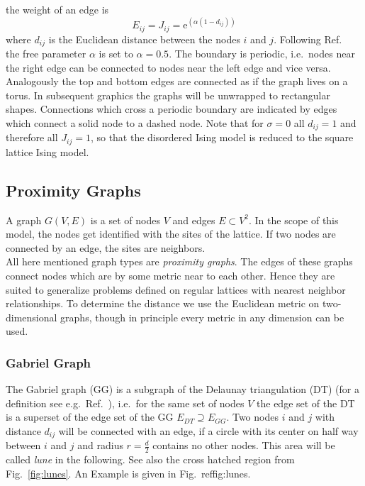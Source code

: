 the weight of an edge is
\begin{equation}
    E_{ij} = J_{ij} = \mathrm{e}^{(\alpha (1-d_{ij}))}
    \label{eq:coupling}
\end{equation}
where \(d_{ij}\) is the Euclidean
distance between the nodes \(i\) and \(j\). Following Ref.\ \cite{Lima2000}
the free parameter \(\alpha\) is set to \(\alpha = 0.5\).
The boundary is periodic, i.e.\ nodes near the right edge can be
connected to nodes near the left edge and vice versa. Analogously the
top and bottom edges are connected as if the graph lives on a torus.
In subsequent graphics the graphs will be unwrapped to rectangular
shapes. Connections which cross a periodic boundary are indicated
by edges which connect a solid node to a dashed node.
Note that for \(\sigma = 0\) all \(d_{ij} = 1\) and therefore all
\(J_{ij} = 1\), so that the disordered Ising model is reduced to the
square lattice Ising model.

\subsection{Proximity Graphs}
\label{ssec:graphtypes}
    A graph \(G(V,E)\) is a set of nodes \(V\) and edges \(E \subset V^{2}\).
    In the scope of this model, the nodes get identified with the sites of the
    lattice. If two nodes are connected by an edge, the sites are neighbors.\\
    All here mentioned graph types are \emph{proximity graphs}.
    The edges of these graphs connect nodes which are by some metric near
    to each other.
    Hence they are suited to generalize problems defined on regular
    lattices with nearest neighbor relationships.
    To determine the distance we use the Euclidean
    metric on two-dimensional graphs, though in principle every metric in any
    dimension can be used.\\

    \subsubsection{Gabriel Graph}
        The Gabriel graph (GG) \cite{Gabriel1969}
        is a subgraph of the Delaunay triangulation (DT) (for a definition
        see e.g.\ Ref.\ \cite{Katajainen}), i.e.\ for the same set of nodes
        \(V\) the edge set of the DT is a superset of the edge set of the
        GG \(E_{DT} \supseteq E_{GG}\). Two nodes \(i\) and \(j\) with distance
        \(d_{ij}\) will be connected with an edge, if a circle with its
        center on half way between \(i\) and \(j\) and radius
        \(r = \frac d 2\) contains no other nodes. This area will be
        called \emph{lune} in the following. See also the cross hatched region
        from Fig.\ \ref{fig:lunes}. An Example is
        given in Fig.\ ref{fig:lunes}.


